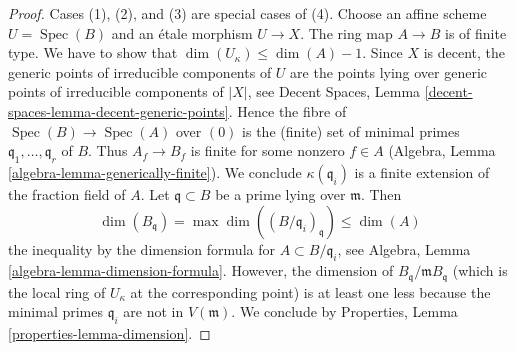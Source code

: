 \documentclass{stacks-project}
\theoremstyle{plain}
\theoremstyle{definition}
\theoremstyle{remark}
\numberwithin{equation}{subsection}
\def\Spec{\mathop{\mathrm{Spec}}}
\begin{document}
\begin{proof}
Cases (1), (2), and (3) are special cases of (4). Choose an affine scheme
$U = \Spec(B)$ and an \'etale morphism $U \to X$. The ring map $A \to B$
is of finite type. We have to show that
$\dim(U_\kappa) \leq \dim(A) - 1$. Since $X$ is decent, the generic
points of irreducible components of $U$ are the points lying over
generic points of irreducible components of $|X|$, see
Decent Spaces, Lemma \ref{decent-spaces-lemma-decent-generic-points}.
Hence the fibre of $\Spec(B) \to \Spec(A)$ over $(0)$
is the (finite) set of minimal primes $\mathfrak q_1, \ldots, \mathfrak q_r$
of $B$. Thus $A_f \to B_f$ is finite for some nonzero $f \in A$
(Algebra, Lemma \ref{algebra-lemma-generically-finite}).
We conclude $\kappa(\mathfrak q_i)$ is a finite extension of the
fraction field of $A$.
Let $\mathfrak q \subset B$ be a prime lying over $\mathfrak m$. Then
$$
\dim(B_\mathfrak q) = \max \dim((B/\mathfrak q_i)_{\mathfrak q})
\leq \dim(A)
$$
the inequality by the dimension formula for $A \subset B/\mathfrak q_i$, see
Algebra, Lemma \ref{algebra-lemma-dimension-formula}.
However, the dimension of $B_\mathfrak q/\mathfrak m B_\mathfrak q$
(which is the local ring of $U_\kappa$ at the corresponding point)
is at least one less because the minimal primes $\mathfrak q_i$
are not in $V(\mathfrak m)$. We conclude by
Properties, Lemma \ref{properties-lemma-dimension}.
\end{proof}
\end{document}
